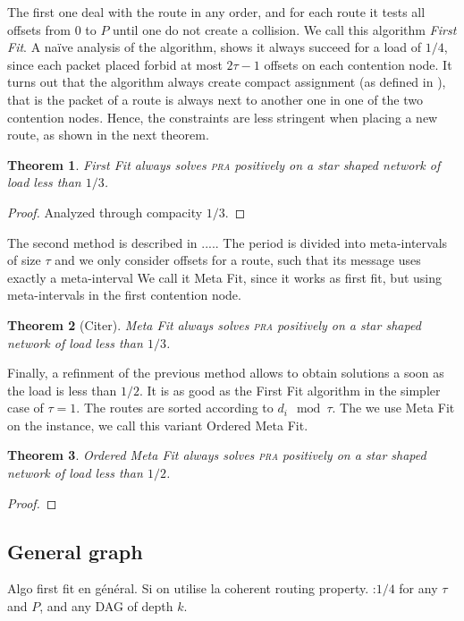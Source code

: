 \documentclass[10pt, conference, letterpaper]{IEEEtran}
\newtheorem{theorem}{Theorem}
\newcommand\pra{\textsc{pra}\xspace}
\begin{document}
The first one deal with the route in any order, and for each route it 
tests all offsets from $0$ to $P$ until one do not create a collision.
We call this algorithm \emph{First Fit}. A naïve analysis of the algorithm, 
shows it always succeed for a load of $1/4$, since each packet placed forbid at most
$2\tau -1$ offsets on each contention node. It turns out that the algorithm always
create compact assignment (as defined in ), that is the packet of a route is always next
to another one in one of the two contention nodes. Hence, the constraints are less stringent when placing a new route, as shown in the next theorem.

\begin{theorem}
First Fit always solves \pra positively on a star shaped network of load less than
$1/3$. 
\end{theorem}
\begin{proof}
Analyzed through compacity $1/3$.
\end{proof}

The second method is described  in .....
The period is divided into meta-intervals of size $\tau$ and we only consider offsets
for a route, such that its message uses exactly a meta-interval
We call it Meta Fit, since it works as first fit, but using meta-intervals
in the first contention node.
\begin{theorem}[Citer]
Meta Fit always solves \pra positively on a star shaped network of load less than $1/3$. 
\end{theorem}

Finally, a refinment of the previous method allows to obtain solutions
a soon as the load is less than $1/2$. It is as good as the First Fit algorithm
in the simpler case of $\tau = 1$. The routes are sorted according to  $d_i \mod \tau$.
The we use Meta Fit on the instance, we call this variant Ordered Meta Fit.

\begin{theorem}
Ordered Meta Fit always solves \pra positively on a star shaped network of load less than $1/2$.
\end{theorem}
\begin{proof}

\end{proof}
\subsection{General graph}

Algo first fit en général.
Si on utilise la coherent routing property.
:$1/4$ for any $\tau$ and $P$, and any DAG of depth $k$. 
\end{document}
